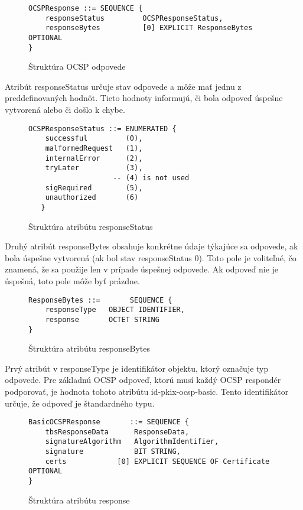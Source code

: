 \documentclass[12pt, twoside]{book}
\begin{document}
\begin{figure}[H]
\begin{lstlisting}
OCSPResponse ::= SEQUENCE {
    responseStatus         OCSPResponseStatus,
    responseBytes          [0] EXPLICIT ResponseBytes OPTIONAL
}
\end{lstlisting}
\caption{Štruktúra OCSP odpovede}
\end{figure}

Atribút responseStatus určuje stav odpovede a môže mať jednu z preddefinovaných hodnôt. Tieto hodnoty informujú, či bola odpoveď úspešne vytvorená alebo či došlo k chybe.\cite{rfc6960}

\begin{figure}[H]
\begin{lstlisting}
OCSPResponseStatus ::= ENUMERATED {
    successful         (0),  
    malformedRequest   (1), 
    internalError      (2),  
    tryLater           (3), 
                    -- (4) is not used
    sigRequired        (5),  
    unauthorized       (6)  
   }
\end{lstlisting}
\caption{Štruktúra atribútu responseStatus}
\end{figure}

Druhý atribút responseBytes obsahuje konkrétne údaje týkajúce sa odpovede, ak bola úspešne vytvorená (ak bol stav responseStatus 0). Toto pole je voliteľné, čo znamená, že sa použije len v prípade úspešnej odpovede. Ak odpoveď nie je úspešná, toto pole môže byť prázdne.\cite{rfc6960}

\begin{figure}[H]
\begin{lstlisting}
ResponseBytes ::=       SEQUENCE {
    responseType   OBJECT IDENTIFIER,
    response       OCTET STRING
}
\end{lstlisting}
\caption{Štruktúra atribútu responseBytes}
\end{figure}

Prvý atribút v responseType je identifikátor objektu, ktorý označuje typ odpovede. Pre základnú OCSP odpoveď, ktorú musí každý OCSP respondér podporovať, je hodnota tohoto atribútu id-pkix-ocsp-basic. Tento identifikátor určuje, že odpoveď je štandardného typu.\cite{rfc6960}

\begin{figure}[H]
\begin{lstlisting}
BasicOCSPResponse       ::= SEQUENCE {
    tbsResponseData      ResponseData,
    signatureAlgorithm   AlgorithmIdentifier,
    signature            BIT STRING,
    certs            [0] EXPLICIT SEQUENCE OF Certificate OPTIONAL
}
\end{lstlisting}
\caption{Štruktúra atribútu response}
\end{figure}
\end{document}
